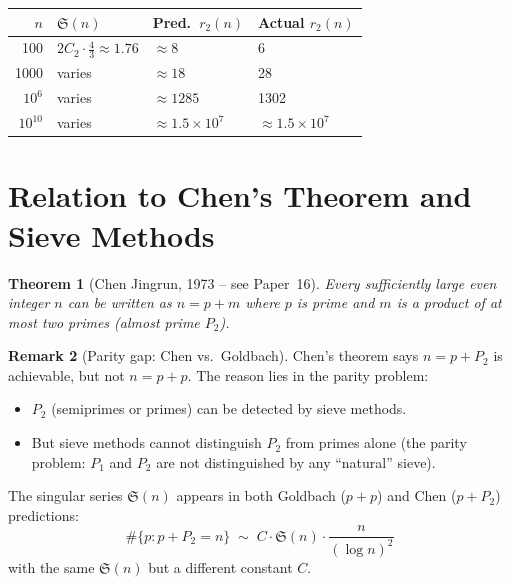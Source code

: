 \documentclass[12pt,a4paper]{amsart}
\newtheorem{theorem}{Theorem}[section]
\theoremstyle{definition}
\newtheorem{remark}[theorem]{Remark}
\begin{document}
\begin{center}
\begin{tabular}{rlll}
\toprule
$n$ & $\mathfrak{S}(n)$ & Pred.\ $r_2(n)$ & Actual $r_2(n)$ \\
\midrule
100  & $2C_2 \cdot \tfrac{4}{3} \approx 1.76$ & $\approx 8$ & 6 \\
1000 & varies & $\approx 18$ & 28 \\
$10^6$ & varies & $\approx 1285$ & 1302 \\
$10^{10}$ & varies & $\approx 1.5\times 10^7$ & $\approx 1.5\times 10^7$ \\
\bottomrule
\end{tabular}
\end{center}

\section{Relation to Chen's Theorem and Sieve Methods}
\label{sec:chen}

\begin{theorem}[Chen Jingrun, 1973 -- see Paper~16]\label{thm:chen}
  Every sufficiently large even integer $n$ can be written as
  $n = p + m$ where $p$ is prime and $m$ is a product of at most two primes
  (\emph{almost prime} $P_2$).
\end{theorem}

\begin{remark}[Parity gap: Chen vs.\ Goldbach]
  Chen's theorem says $n = p + P_2$ is achievable, but not $n = p + p$.
  The reason lies in the parity problem:
  \begin{itemize}
    \item $P_2$ (semiprimes or primes) can be detected by sieve methods.
    \item But sieve methods cannot distinguish $P_2$ from primes alone
      (the parity problem: $P_1$ and $P_2$ are not distinguished by
      any ``natural'' sieve).
  \end{itemize}
  The singular series $\mathfrak{S}(n)$ appears in both Goldbach ($p+p$)
  and Chen ($p + P_2$) predictions:
  \[
    \#\{p : p + P_2 = n\} \;\sim\; C \cdot \mathfrak{S}(n) \cdot \frac{n}{(\log n)^2}
  \]
  with the same $\mathfrak{S}(n)$ but a different constant $C$.
\end{remark}

\end{document}
